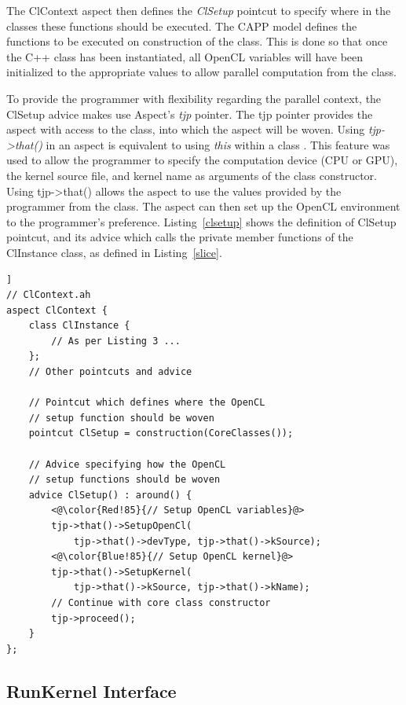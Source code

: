 \documentclass{sig-alternate-05-2015}
\begin{document}
The ClContext aspect then defines the \textit{ClSetup} pointcut to
specify where in the \CPP classes these functions should be executed. The
CAPP model defines the functions to be executed on construction of the
\CPP class. This is done so that once the C++ class has been instantiated,
all OpenCL variables will have been initialized to the appropriate values to allow
parallel computation from the \CPP class. 

To provide the programmer with flexibility regarding the parallel context,
the ClSetup advice makes use Aspect\CPP's \textit{tjp} pointer. 
The tjp pointer provides the aspect with access to the \CPP class, 
into which the aspect will be woven. Using \textit{tjp->that()} in an aspect 
is equivalent to using \textit{this} within a \CPP class . This feature was used 
to allow the programmer to specify the computation device (CPU or GPU), the 
kernel source file, and kernel name as arguments of the \CPP class constructor. 
Using tjp->that() allows the aspect to use the values provided by the 
programmer from the \CPP class. The aspect can then set up the OpenCL environment
to the programmer's preference.
Listing~\ref{clsetup} shows the definition of ClSetup pointcut, and its 
advice which calls the private member functions of the ClInstance
class, as defined in Listing~\ref{slice}.

\begin{lstlisting}[caption=Abstract aspect with the pointcut and advice for
OpenCL setup.,label=clsetup,float=[!t]]
// ClContext.ah
aspect ClContext {
	class ClInstance {
		// As per Listing 3 ...
	};
	// Other pointcuts and advice

	// Pointcut which defines where the OpenCL
	// setup function should be woven
	pointcut ClSetup = construction(CoreClasses());
  
	// Advice specifying how the OpenCL
	// setup functions should be woven
	advice ClSetup() : around() {
		<@\color{Red!85}{// Setup OpenCL variables}@>
		tjp->that()->SetupOpenCl(
			tjp->that()->devType, tjp->that()->kSource);
		<@\color{Blue!85}{// Setup OpenCL kernel}@>
		tjp->that()->SetupKernel(
			tjp->that()->kSource, tjp->that()->kName); 
		// Continue with core class constructor
		tjp->proceed();
	}
};
\end{lstlisting}

\subsection{RunKernel Interface}
\end{document}
